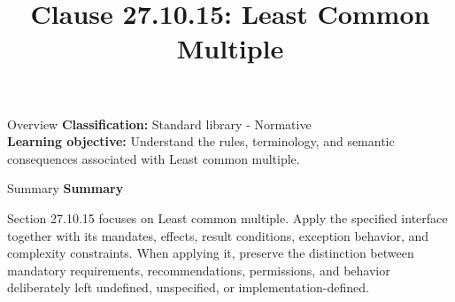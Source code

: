 \documentclass[10pt,letterpaper]{article}
\title{Clause 27.10.15: Least Common Multiple}
\author{}
\date{}
\begin{document}
\maketitle
\begin{CornellOverviewBox}{Overview}
\textbf{Classification:} Standard library - Normative\\[2pt]
\textbf{Learning objective:} Understand the rules, terminology, and semantic consequences associated with Least common multiple.
\end{CornellOverviewBox}\begin{CornellSummaryBox}{Summary}
{\sffamily\bfseries\color{Accent} Summary}\par\vspace{3pt}Section 27.10.15 focuses on Least common multiple. Apply the specified interface together with its mandates, effects, result conditions, exception behavior, and complexity constraints. When applying it, preserve the distinction between mandatory requirements, recommendations, permissions, and behavior deliberately left undefined, unspecified, or implementation-defined.
\end{CornellSummaryBox}
\end{document}
